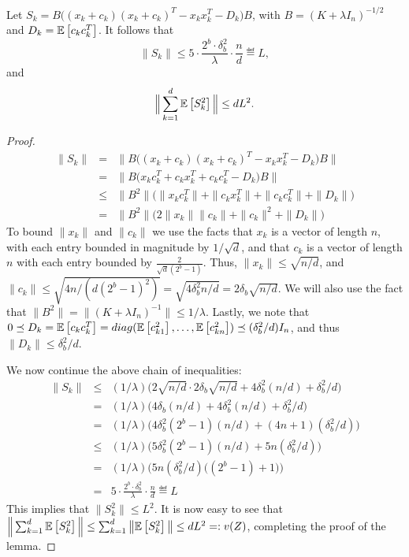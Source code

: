 \documentclass[12pt]{article}
\begin{document}
\begin{lemma}
	\label{upper_bounds}
	Let $S_k = B\Big((x_k + c_k)(x_k + c_k)^T  - x_k x_k^T - D_k\Big)B$, with $B=(K+\lambda I_n)^{-1/2}$ and $D_k=\expect{}{c_k c_k^T}$.  It follows that
	$$\|S_k\| \leq 5 \cdot \frac{2^b \cdot \delta_b^2}{\lambda}\cdot  \frac{n}{d} \eqdef L,$$
	and
	$$\Big\|\sum_{k=1}^d \expect{}{S_k^2}\Big\| \leq dL^2.$$
\end{lemma}
\begin{proof}
\begin{eqnarray*}
\|S_k\| &=& \|B\Big((x_k + c_k)(x_k + c_k)^T  - x_k x_k^T - D_k\Big)B\| \\
&=& \|B\Big(x_kc_k^T + c_kx_k^T + c_k c_k^T - D_k\Big)B\| \\
&\leq& \|B^2\|\Big(\|x_kc_k^T\| + \|c_kx_k^T\| + \|c_k c_k^T\| + \|D_k\|\Big) \\
&=& \|B^2\|\Big(2\|x_k\|\|c_k\| + \|c_k\|^2 + \|D_k\|\Big) 
\end{eqnarray*}
To bound $\|x_k\|$ and $\|c_k\|$ we use the facts that $x_k$ is a vector of length $n$, with each entry bounded in magnitude by $1/\sqrt{d}$, and that $c_k$ is a vector of length $n$ with each entry bounded by $\frac{2}{\sqrt{d}(2^b-1)}$.  Thus, $\|x_k\| \leq \sqrt{n/d}$, and $\|c_k\| \leq \sqrt{4n/(d(2^b-1)^2)} = \sqrt{4\delta_b^2n/d} = 2\delta_b\sqrt{n/d}$.  We will also use the fact that $\|B^2\| = \|(K+\lambda I_n)^{-1}\| \leq 1/\lambda$.  Lastly, we note that $0 \preceq D_k = \expect{}{c_k c_k^T} = diag(\expect{}{c_{k1}^2},\ldots,\expect{}{c_{kn}^2}) \preceq (\delta_b^2/d) I_n$, and thus $\|D_k\| \leq \delta_b^2/d$.

We now continue the above chain of inequalities:
\begin{eqnarray*}
\|S_k\| &\leq& (1/\lambda)\Big(2\sqrt{n/d}\cdot 2\delta_b\sqrt{n/d} + 4\delta_b^2(n/d) + \delta_b^2/d\Big)\\
&=& (1/\lambda)\Big(4\delta_b(n/d) + 4\delta_b^2(n/d) + \delta_b^2/d\Big) \\
&=& (1/\lambda)\Big(4\delta_b^2(2^b-1)(n/d) + (4n + 1)(\delta_b^2/d)\Big) \\
&\leq& (1/\lambda)\Big(5\delta_b^2(2^b-1)(n/d) + 5n(\delta_b^2/d)\Big) \\
&=& (1/\lambda)\Big(5n(\delta_b^2/d)\Big((2^b-1)+1\Big)\Big) \\
&=& 5 \cdot \frac{2^b \cdot \delta_b^2}{\lambda}\cdot  \frac{n}{d} \eqdef L
\end{eqnarray*}
This implies that $\|S_k^2\| \leq L^2$.  It is now easy to see that 
$\Big\|\sum_{k=1}^d \expect{}{S_k^2}\Big\| \leq \sum_{k=1}^d \big\|\expect{}{S_k^2}\big\| \leq dL^2 \eqdef v(Z)$, completing the proof of the lemma.



\end{proof}
\end{document}
